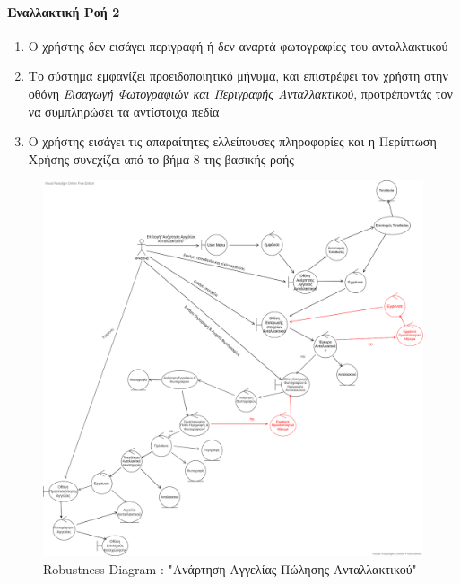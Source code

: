 \documentclass{../ol-softwaremanual}
\begin{document}
	\paragraph{Εναλλακτική Ροή 2}
	
	\begin{enumerate}
		\item Ο χρήστης δεν εισάγει περιγραφή ή δεν αναρτά φωτογραφίες του ανταλλακτικού
		\item Το σύστημα εμφανίζει προειδοποιητικό μήνυμα, και επιστρέφει τον χρήστη στην οθόνη \textit{Εισαγωγή Φωτογραφιών και Περιγραφής Ανταλλακτικού}, προτρέποντάς τον να συμπληρώσει τα αντίστοιχα πεδία
		\item Ο χρήστης εισάγει τις απαραίτητες ελλείπουσες πληροφορίες και η Περίπτωση Χρήσης συνεχίζει από το βήμα 8 της βασικής ροής
	\end{enumerate}
	
	\begin{figure}[htbp!]
		\includegraphics[scale=0.32]{img/rob_spare_part_listing.png}
		\caption{\en Robustness Diagram : "\gr Ανάρτηση Αγγελίας Πώλησης Ανταλλακτικού\en"\gr}
	\end{figure}
	
	\newpage
	\centering
	
\end{document}
